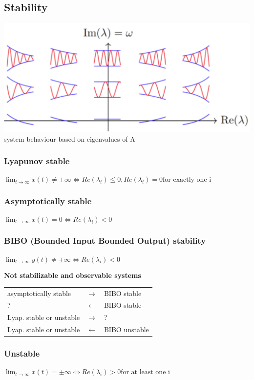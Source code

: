 \subsection{Stability}
    \includegraphics[width = \linewidth]{src/images/eigenvalue_response.png}
    system behaviour based on eigenvalues of A

    \subsubsection{Lyapunov stable}
    $\lim_{t \rightarrow \infty} x(t) \neq \pm \infty \Leftrightarrow Re(\lambda_i) \leq 0, Re(\lambda_i) = 0 \text{for exactly one i}$

    \subsubsection{Asymptotically stable}
    $\lim_{t \rightarrow \infty} x(t) = 0 \Leftrightarrow Re(\lambda_i) < 0$

    \subsubsection{BIBO (Bounded Input Bounded Output) stability}
    $\lim_{t \rightarrow \infty} y(t) \neq \pm \infty \Leftrightarrow Re(\lambda_i) < 0$

    \begin{center}
        \textbf{Not stabilizable and observable systems}
    \end{center}
    \begin{tabu}{|X[6] X X[3]|}
        \hline
        asymptotically stable & $\rightarrow$ & BIBO stable\\
        ? & $\leftarrow$ & BIBO stable\\
        Lyap. stable or unstable & $\rightarrow$ & ?\\
        Lyap. stable or unstable & $\leftarrow$ & BIBO unstable\\
        \hline
    \end{tabu}

    \subsubsection{Unstable}
    $\lim_{t \rightarrow \infty} x(t) = \pm \infty \Leftrightarrow Re(\lambda_i) > 0 \text{for at least one i}$
